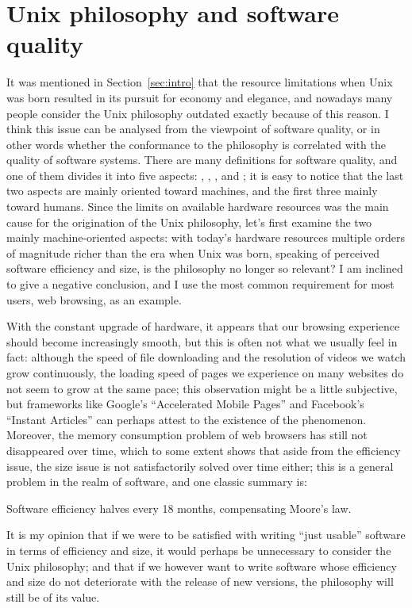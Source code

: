 \section{Unix philosophy and software quality}\label{sec:quality}

It was mentioned in Section~\ref{sec:intro} that the resource limitations when
Unix was born resulted in its pursuit for economy and elegance, and nowadays
many people consider the Unix philosophy outdated exactly because of this
reason.  I think this issue can be analysed from the viewpoint of software
quality, or in other words whether the conformance to the philosophy is
correlated with the quality of software systems.  There are many definitions for
software quality, and one of them divides it into five
aspects: , , ,
 and ; it is easy to notice that the last two
aspects are mainly oriented toward machines, and the first three mainly toward
humans.  Since the limits on available hardware resources was the main cause
for the origination of the Unix philosophy, let's first examine the two mainly
machine-oriented aspects: with today's hardware resources multiple orders of
magnitude richer than the era when Unix was born, speaking of perceived
software efficiency and size, is the philosophy no longer so relevant?
I am inclined to give a negative conclusion, and I use the most common
requirement for most users, web browsing, as an example.

With the constant upgrade of hardware, it appears that our browsing experience
should become increasingly smooth, but this is often not what we usually feel
in fact: although the speed of file downloading and the resolution of videos
we watch grow continuously, the loading speed of pages we experience on many
websites do not seem to grow at the same pace; this observation might be a
little subjective, but frameworks like Google's ``Accelerated Mobile Pages''
and Facebook's ``Instant Articles'' can perhaps attest to the existence of
the phenomenon.  Moreover, the memory consumption problem of web browsers
has still not disappeared over time, which to some extent shows that
aside from the efficiency issue, the size issue is not satisfactorily
solved over time either; this is a general problem in the realm of
software, and one classic summary is:
\begin{quoting}
	Software efficiency halves every 18 months, compensating Moore's law.
\end{quoting}
It is my opinion that if we were to be satisfied with writing ``just usable''
software in terms of efficiency and size, it would perhaps be unnecessary to
consider the Unix philosophy; and that if we however want to write software
whose efficiency and size do not deteriorate with the release of new
versions, the philosophy will still be of its value.

